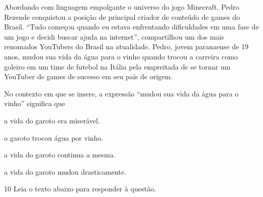 \begin{myquote}

Abordando com linguagem empolgante o universo do jogo Minecraft, Pedro Rezende
conquistou a posição de principal criador de conteúdo de games do Brasil.
``Tudo começou quando eu estava enfrentando dificuldades em uma fase de um
jogo e decidi buscar ajuda na internet'', compartilhou um dos mais renomados
YouTubers do Brasil na atualidade. Pedro, jovem paranaense de 19 anos, mudou
sua vida da água para o vinho quando trocou a carreira como goleiro em um time
de futebol na Itália pela empreitada de se tornar um YouTuber de games de
sucesso em seu país de origem.


\end{myquote}


No contexto em que se insere, a expressão ``mudou sua vida da água para o vinho''
significa que 

\begin{escolha}

    \item a vida do garoto era miserável.

    \item o garoto trocou água por vinho.

    \item a vida do garoto continua a mesma.

    \item a vida do garoto mudou drasticamente.

\end{escolha}

\num{10} Leia o texto abaixo para responder à questão.

